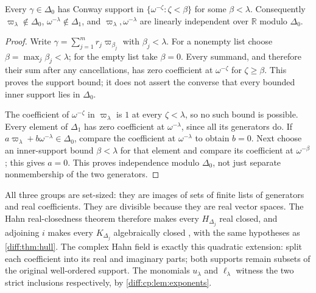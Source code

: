 \documentclass[11pt,letterpaper]{article}
\numberwithin{equation}{section}
\theoremstyle{definition}
\theoremstyle{remark}
\newcommand{\R}{\mathbb R}
\begin{document}
\begin{lemma}
\label{diff:cp:lem:exponents}
Every $\gamma\in\Delta_{0}$ has Conway support in
$\{\omega^{-\zeta}:\zeta<\beta\}$ for some $\beta<\lambda$. Consequently
$\varpi_{\lambda}\notin\Delta_{0}$, $\omega^{-\lambda}\notin\Delta_{1}$, and
$\varpi_{\lambda},\omega^{-\lambda}$ are linearly independent over $\R$
modulo $\Delta_{0}$.
\end{lemma}
\begin{proof}
Write $\gamma=\sum_{j=1}^{m}r_j\varpi_{\beta_j}$ with
$\beta_j<\lambda$. For a nonempty list choose
$\beta=\max_j\beta_j<\lambda$; for the empty list take $\beta=0$.
Every summand, and therefore their sum after any cancellations,
has zero coefficient at $\omega^{-\zeta}$ for $\zeta\geq\beta$.
This proves the support bound; it does not assert the converse
that every bounded inner support lies in $\Delta_0$.

The coefficient of $\omega^{-\zeta}$ in $\varpi_{\lambda}$ is
$1$ at every $\zeta<\lambda$, so no such bound is possible.
Every element of $\Delta_{1}$ has zero coefficient at
$\omega^{-\lambda}$, since all its generators do. If
$a\varpi_{\lambda}+b\omega^{-\lambda}\in\Delta_{0}$, compare the
coefficient at $\omega^{-\lambda}$ to obtain $b=0$. Next choose
an inner-support bound $\beta<\lambda$ for that element and
compare its coefficient at $\omega^{-\beta}$; this gives $a=0$.
This proves independence modulo $\Delta_0$, not just separate
nonmembership of the two generators.
\end{proof}

All three groups are set-sized: they are images of sets of finite
lists of generators and real coefficients. They are divisible
because they are real vector spaces. The Hahn real-closedness
theorem therefore makes every $H_{\Delta_j}$ real closed, and
adjoining $i$ makes every $K_{\Delta_j}$ algebraically closed
\cite[Section~2.3]{BM}, with the same hypotheses as
\cref{diff:thm:hull}. The complex Hahn field is exactly this
quadratic extension: split each coefficient into its real and
imaginary parts; both supports remain subsets of the original
well-ordered support. The monomials $u_{\lambda}$ and
$\ell_{\lambda}$ witness the two strict inclusions respectively,
by \cref{diff:cp:lem:exponents}.
\end{document}

